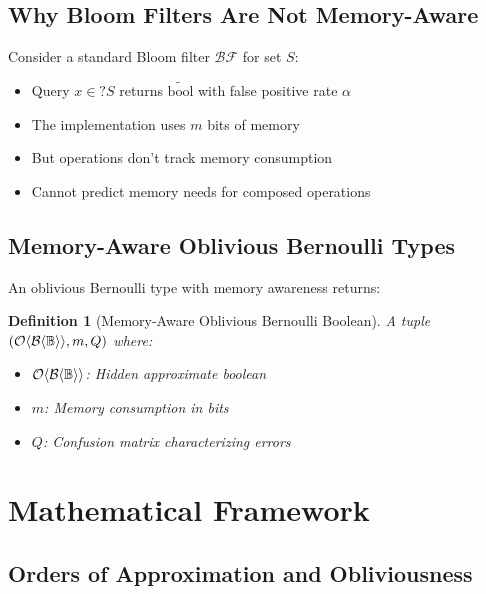 \documentclass[11pt,final]{article}
\newcommand{\BernBool}{\mathcal{B}\langle \Bool \rangle}
\newcommand{\observed}[1]{\tilde{#1}}
\newtheorem{definition}[theorem]{Definition}
\begin{document}
\subsection{Why Bloom Filters Are Not Memory-Aware}

Consider a standard Bloom filter $\mathcal{BF}$ for set $S$:
\begin{itemize}
    \item Query $x \in? S$ returns $\observed{\text{bool}}$ with false positive rate $\alpha$
    \item The implementation uses $m$ bits of memory
    \item But operations don't track memory consumption
    \item Cannot predict memory needs for composed operations
\end{itemize}

\subsection{Memory-Aware Oblivious Bernoulli Types}

An oblivious Bernoulli type with memory awareness returns:

\begin{definition}[Memory-Aware Oblivious Bernoulli Boolean]
A tuple $(\Obv{\BernBool}, m, Q)$ where:
\begin{itemize}
    \item $\Obv{\BernBool}$: Hidden approximate boolean
    \item $m$: Memory consumption in bits
    \item $Q$: Confusion matrix characterizing errors
\end{itemize}
\end{definition}

\section{Mathematical Framework}

\subsection{Orders of Approximation and Obliviousness}
\end{document}
